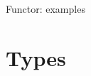 \documentclass[pdf]{beamer}
\begin{document}
\begin{frame}{Functor: examples}
  \begin{figure}[H]
    \centering
    \hspace{0.2cm}
  \end{figure}
\end{frame}

\section{Types}
\label{sec:types}
\end{document}
